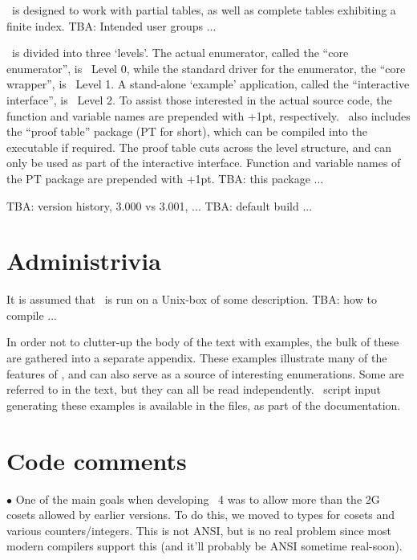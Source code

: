 
%
%

\ace\ is designed to work with partial tables, as well as complete tables
  exhibiting a finite index.
TBA:
Intended user groups ...

\ace\ is divided into three `levels'\kern-1.5pt.
The actual enumerator, called the ``core enumerator''\kern-2pt, is \ace\ 
  Level 0, while the standard driver for the enumerator, the ``core 
  wrapper''\kern-2pt, is \ace\ Level 1.
A stand-alone `example' application, called the ``interactive 
  interface''\kern-2pt, is \ace\ Level 2.
To assist those interested in the actual source code, the function and 
  variable names are prepended with \ttt{AL0\_}\kern+1pt, \ttt{AL1\_} \amp
  \ttt{AL2\_} respectively.
%
\ace\ also includes the ``proof table'' package (PT for short), which can
  be compiled into the executable if required.
The proof table cuts across the level structure, and can only be used as
  part of the interactive interface.
Function and variable names of the PT package are prepended with 
  \ttt{PT\_}\kern+1pt.
TBA: this package ...

TBA: version history, 3.000 vs 3.001, ...
TBA: default build ...

\section{Administrivia}

It is assumed that \ace\ is run on a Unix-box of some description.
TBA: how to compile ...

In order not to clutter-up the body of the text with examples, the bulk of
  these are gathered into a separate appendix.
These examples illustrate many of the features of \ace, and can also serve
  as a source of interesting enumerations.
Some are referred to in the text, but they can all be read independently.
\ace\ script input generating these examples is available in the 
  \ttt{ex***.in} files, as part of the documentation.

\section{Code comments}

$\bullet$
One of the main goals when developing \ace\ 4 was to allow more than the 2G
  cosets allowed by earlier versions.
To do this, we moved to   types for cosets and various
  counters/integers.
This is not ANSI, but is no real problem since most modern compilers
  support this (and it'll probably be ANSI sometime real-soon).

